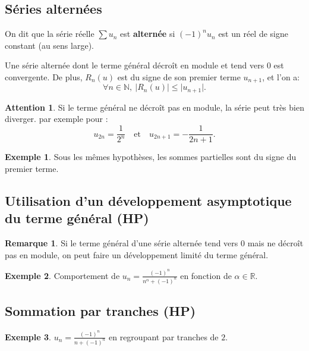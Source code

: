 \documentclass[french]{article}
\newcommand{\N}{\mathbb{N}}
\newcommand{\R}{\mathbb{R}}
\theoremstyle{plain}
\theoremstyle{definition}
\newtheorem*{ex}{Exemple}
\newtheorem*{rmq}{Remarque}
\newtheorem*{attention}{Attention}
\theoremstyle{remark}
\begin{document}
\subsection{Séries alternées}

\begin{dfn}
	On dit que la série réelle $\displaystyle\sum u_n$ est \textbf{alternée} si $(-1)^nu_n$ est un réel de signe constant (au sens large).
\end{dfn}

\begin{thm}%
	Une série alternée dont le terme général décroît en module et tend vers $0$ est convergente. De plus, $R_n(u)$ est du signe de son premier terme $u_{n+1}$, et l'on a: $$\forall n\in\N,\ \lvert R_n(u)\rvert\leqslant\lvert u_{n+1}\rvert.$$
\end{thm}

\begin{attention}
	Si le terme général ne décroît pas en module, la série peut très bien diverger. par exemple pour : $$u_{2n}=\frac{1}{2^n}\quad \text{et}\quad u_{2n+1}=-\frac{1}{2n+1}.$$
\end{attention}

\begin{ex}
	Sous les mêmes hypothèses, les sommes partielles sont du signe du premier terme.
\end{ex}

\subsection{Utilisation d'un développement asymptotique du terme général (HP)}

\begin{rmq}
	Si le terme général d'une série alternée tend vers $0$ mais ne décroît pas en module, on peut faire un développement limité du terme général.
\end{rmq}

\begin{ex}
	Comportement de $u_n=\displaystyle\frac{(-1)^n}{n^\alpha+(-1)^n}$ en fonction de $\alpha\in\R$.
\end{ex}

\subsection{Sommation par tranches (HP)}

\begin{ex}
	$u_n=\displaystyle\frac{(-1)^n}{n+(-1)^n}$ en regroupant par tranches de $2$.
\end{ex}
\end{document}
